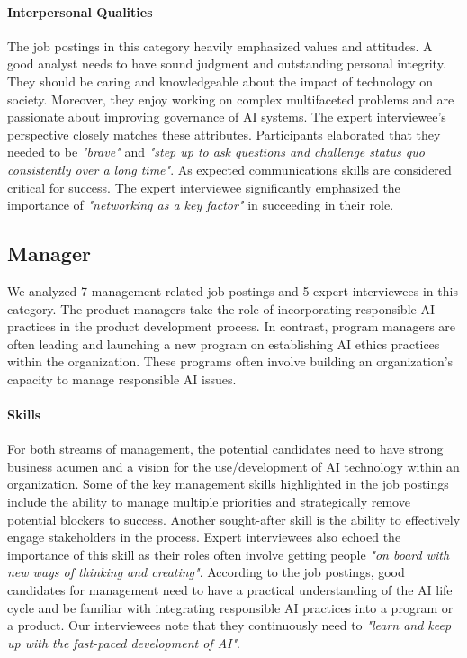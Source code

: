 \documentclass[sigconf]{acmart}
\begin{document}
\paragraph{Interpersonal Qualities}
The job postings in this category heavily emphasized values and attitudes. A good analyst needs to have sound judgment and outstanding personal integrity. They should be caring and knowledgeable about the impact of technology on society. Moreover, they enjoy working on complex multifaceted problems and are passionate about improving governance of \ac{AI} systems. The expert interviewee's perspective closely matches these attributes. Participants elaborated that they needed to be \textit{"brave"} and \textit{"step up to ask questions and challenge status quo consistently over a long time"}. As expected communications skills are considered critical for success. The expert interviewee significantly emphasized the importance of \textit{"networking as a key factor"} in succeeding in their role. 

\subsection{Manager} 
We analyzed 7 management-related job postings and 5 expert interviewees in this category. The product managers take the role of incorporating responsible \ac{AI} practices in the product development process. In contrast, program managers are often leading and launching a new program on establishing \ac{AI} ethics practices within the organization. These programs often involve building an organization's capacity to manage responsible \ac{AI} issues. 

\paragraph{Skills} 
For both streams of management, the potential candidates need to have strong business acumen and a vision for the use/development of AI technology within an organization. Some of the key management skills highlighted in the job postings include the ability to manage multiple priorities and strategically remove potential blockers to success. Another sought-after skill is the ability to effectively engage stakeholders in the process. Expert interviewees also echoed the importance of this skill as their roles often involve getting people \textit{"on board with new ways of thinking and creating"}. According to the job postings, good candidates for management need to have a practical understanding of the \ac{AI} life cycle and be familiar with integrating responsible \ac{AI} practices into a program or a product. Our interviewees note that they continuously need to \textit{"learn and keep up with the fast-paced development of \ac{AI}"}. 
\end{document}
